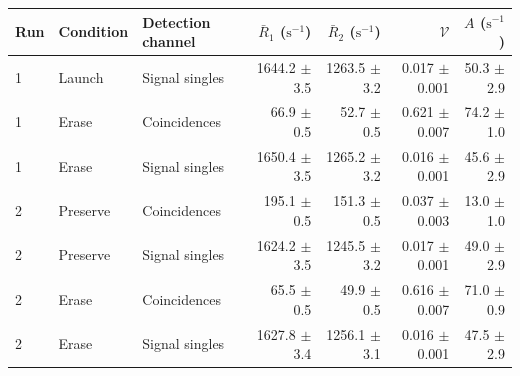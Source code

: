 \begin{tabular}{lllrrrr}
\toprule
Run & Condition & Detection channel & $\bar R_1$ ($\mathrm{s}^{-1}$) & $\bar R_2$ ($\mathrm{s}^{-1}$) & $\mathcal{V}$ & $A$ ($\mathrm{s}^{-1}$) \\
\midrule
1 & Launch & Signal singles & 1644.2 \ensuremath{\pm} 3.5 & 1263.5 \ensuremath{\pm} 3.2 & 0.017 \ensuremath{\pm} 0.001 & 50.3 \ensuremath{\pm} 2.9 \\
1 & Erase & Coincidences & 66.9 \ensuremath{\pm} 0.5 & 52.7 \ensuremath{\pm} 0.5 & 0.621 \ensuremath{\pm} 0.007 & 74.2 \ensuremath{\pm} 1.0 \\
1 & Erase & Signal singles & 1650.4 \ensuremath{\pm} 3.5 & 1265.2 \ensuremath{\pm} 3.2 & 0.016 \ensuremath{\pm} 0.001 & 45.6 \ensuremath{\pm} 2.9 \\
2 & Preserve & Coincidences & 195.1 \ensuremath{\pm} 0.5 & 151.3 \ensuremath{\pm} 0.5 & 0.037 \ensuremath{\pm} 0.003 & 13.0 \ensuremath{\pm} 1.0 \\
2 & Preserve & Signal singles & 1624.2 \ensuremath{\pm} 3.5 & 1245.5 \ensuremath{\pm} 3.2 & 0.017 \ensuremath{\pm} 0.001 & 49.0 \ensuremath{\pm} 2.9 \\
2 & Erase & Coincidences & 65.5 \ensuremath{\pm} 0.5 & 49.9 \ensuremath{\pm} 0.5 & 0.616 \ensuremath{\pm} 0.007 & 71.0 \ensuremath{\pm} 0.9 \\
2 & Erase & Signal singles & 1627.8 \ensuremath{\pm} 3.4 & 1256.1 \ensuremath{\pm} 3.1 & 0.016 \ensuremath{\pm} 0.001 & 47.5 \ensuremath{\pm} 2.9 \\
\bottomrule
\end{tabular}
